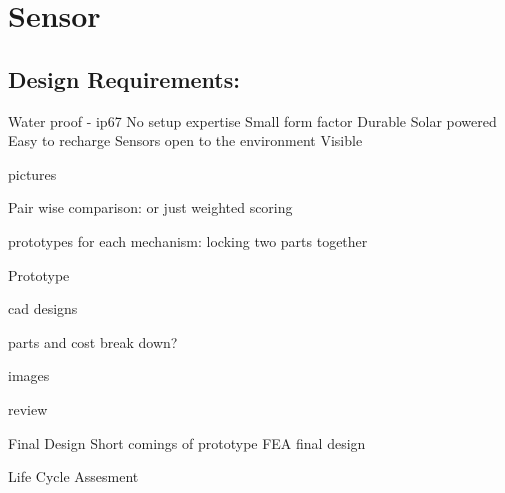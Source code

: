 \section{Sensor}

\subsection{Design Requirements:}

Water proof - ip67
No setup expertise
Small form factor
Durable
Solar powered
Easy to recharge
Sensors open to the environment
Visible



pictures

Pair wise comparison: or just weighted scoring




prototypes for each mechanism:
locking two parts together


Prototype

cad designs

parts and cost break down?

images

review


Final Design
Short comings of prototype FEA
final design


Life Cycle Assesment